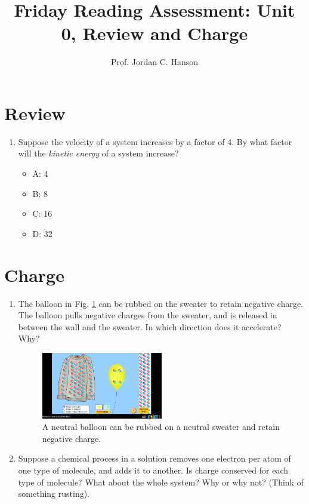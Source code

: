 \documentclass{article}
\begin{document}
\title{Friday Reading Assessment: Unit 0, Review and Charge}
\author{Prof. Jordan C. Hanson}

\maketitle

\section{Review}

\begin{enumerate}
\item Suppose the velocity of a system increases by a factor of 4.  By what factor will the \textit{kinetic energy} of a system increase?
\begin{itemize}
\item A: 4
\item B: 8
\item C: 16
\item D: 32
\end{itemize}
\end{enumerate}

\section{Charge}

\begin{enumerate}
\item The balloon in Fig. \ref{fig:balloon} can be rubbed on the sweater to retain negative charge.  The balloon pulls negative charges from the sweater, and is released in between the wall and the sweater.  In which direction does it accelerate?  Why? \\ \vspace{2cm}
\begin{figure}
\centering
\includegraphics[width=0.5\textwidth]{balloon.png}
\caption{\label{fig:balloon} A neutral balloon can be rubbed on a neutral sweater and retain negative charge.}
\end{figure}
\item Suppose a chemical process in a solution removes one electron per atom of one type of molecule, and adds it to another.  Is charge conserved for each type of molecule?  What about the whole system?  Why or why not?  (Think of something rusting).
\end{enumerate}
\end{document}
